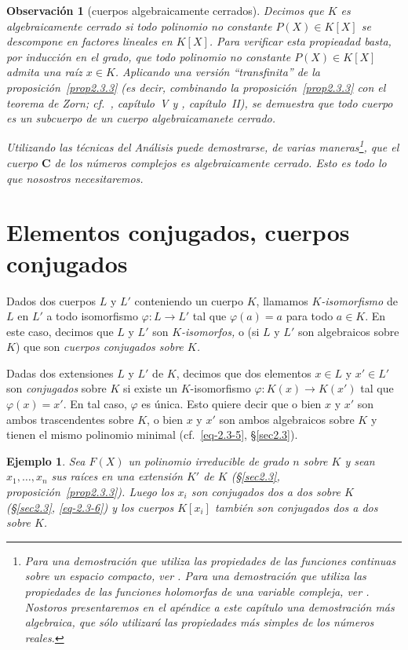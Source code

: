 \documentclass[bibtotoc,leqno,spanish]{amsbook}
\newcommand{\CC}{\mathbf{C}}
\renewcommand{\to}[1][]{\xrightarrow{#1}}
\numberwithin{equation}{section}
\theoremstyle{note}
\theoremstyle{note}
\theoremstyle{rem}
\newtheorem*{example*}{Ejemplo}
\newtheorem*{remark*}{Observaci\'on}
\numberwithin{theorem}{section}
\numberwithin{proposition}{section}
\numberwithin{definition}{section}
\numberwithin{lemma}{section}
\numberwithin{corollary}{section}
\numberwithin{example}{section}
\numberwithin{footnote}{section}%
\begin{document}
\begin{remark*}[cuerpos algebraicamente cerrados]
Decimos que $K$ es {\em algebraicamente cerrado}
si {\em todo} polinomio no constante $P(X)\in K[X]$ se descompone en factores lineales en $K[X]$. Para verificar
esta propieadad basta, por inducci\'on en el grado, que todo polinomio no constante $P(X)\in K[X]$ admita una
ra\'iz $x\in K$. Aplicando una versi\'on ``transfinita'' de la proposici\'on~\ref{prop2.3.3} (es decir,
combinando la proposici\'on~\ref{prop2.3.3} con el
teorema de Zorn; cf.~\cite{Bourbaki1}, cap\'itulo~V y \cite{ZariskiSamuel}, cap\'itulo~II), se demuestra que todo cuerpo
es un subcuerpo de un cuerpo algebraicamanete cerrado.

Utilizando las t\'ecnicas del An\'alisis puede demostrarse, de varias maneras\footnote{Para una demostraci\'on que utiliza las
propiedades de las funciones continuas sobre un espacio compacto, ver \cite{Choquet}. Para una demostraci\'on que utiliza
las propiedades de las funciones holomorfas de una variable compleja, ver \cite{Cartan}. Nostoros presentaremos
en el ap\'endice a este cap\'itulo una demostraci\'on m\'as algebraica, que s\'olo utilizar\'a las propiedades
m\'as simples de los n\'umeros reales.}, que el cuerpo $\CC$ de los {\em n\'umeros complejos}
es algebraicamente cerrado. Esto es todo lo que nosostros necesitaremos.
\end{remark*}

\section{Elementos conjugados, cuerpos conjugados}\label{sec2.4}

Dados dos cuerpos $L$ y $L'$ conteniendo un cuerpo $K$, llamamos {\em $K$-isomorfismo} de $L$ en $L'$
a todo isomorfismo $\varphi:L\to L'$ tal que $\varphi(a) = a$ para todo $a\in K$. En este caso, decimos que
$L$ y $L'$ son {\em $K$-isomorfos,} o (si $L$ y $L'$ son algebraicos sobre $K$) que son {\em cuerpos conjugados
sobre $K$.}

Dadas dos extensiones $L$ y $L'$ de $K$, decimos que dos elementos $x\in L$ y $x'\in L'$ son {\em conjugados}
sobre $K$ si existe un $K$-isomorfismo $\varphi:K(x)\to K(x')$ tal que $\varphi(x) = x'$. En tal caso,
$\varphi$ es \'unica. Esto quiere decir que o bien $x$ y $x'$ son ambos trascendentes sobre $K$,
o bien $x$ y $x'$ son ambos algebraicos sobre $K$ y tienen el mismo polinomio minimal (cf.~\eqref{eq-2.3-5}, \S\ref{sec2.3}).

\begin{example*}
Sea $F(X)$ un polinomio \emph{irreducible} de grado $n$ sobre $K$ y sean
$x_{1},\dots,x_{n}$ sus ra\'ices en una extensi\'on $K'$ de $K$ (\S\ref{sec2.3}, proposici\'on~\ref{prop2.3.3}). Luego los $x_{i}$
son conjugados dos a dos sobre $K$ (\S\ref{sec2.3}, \eqref{eq-2.3-6}) y los cuerpos $K[x_{i}]$ tambi\'en son conjugados
dos a dos sobre $K$.
\end{example*}
\end{document}
